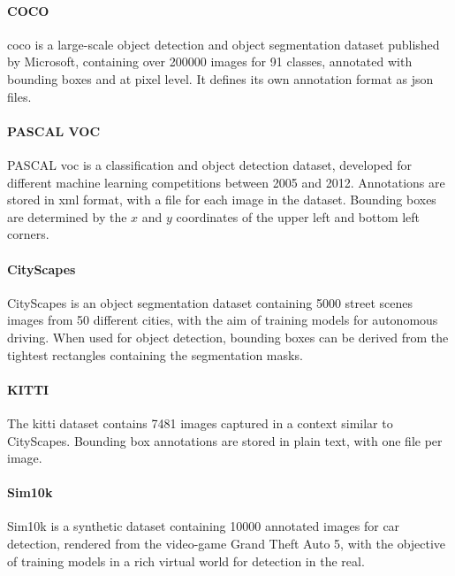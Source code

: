 \documentclass[%
    corpo=12pt,
    twoside,
    stile=classica,   
    tipotesi=magistrale,
    evenboxes,
    english,
	numerazioneromana,
]{toptesi}
\begin{document}
\paragraph{COCO}\label{sec:coco}
\gls{coco} is a large-scale object detection and object segmentation dataset published by Microsoft, containing over 200000 images for 91 classes, annotated with bounding boxes and at pixel level\cite{lin2015microsoft}. It defines its own annotation format as \acrshort{json} files.

\paragraph{PASCAL VOC}
PASCAL \gls{voc} is a classification and object detection dataset, developed for different machine learning competitions between 2005 and 2012\cite{voc}. Annotations are stored in \acrshort{xml} format, with a file for each image in the dataset. Bounding boxes are determined by the $x$ and $y$ coordinates of the upper left and bottom left corners.

\paragraph{CityScapes}
CityScapes is an object segmentation dataset containing 5000 street scenes images from 50 different cities, with the aim of training models for autonomous driving\cite{cordts2016cityscapes}. When used for object detection, bounding boxes can be derived from the tightest rectangles containing the segmentation masks.

\paragraph{KITTI}
The \gls{kitti} dataset\cite{Geiger2013IJRR} contains 7481 images captured in a context similar to CityScapes. Bounding box annotations are stored in plain text, with one file per image.

\paragraph{Sim10k}
Sim10k is a synthetic dataset containing 10000 annotated images for car detection, rendered from the video-game Grand Theft Auto 5, with the objective of training models in a rich virtual world for detection in the real\cite{johnsonroberson2017driving}.
\end{document}

